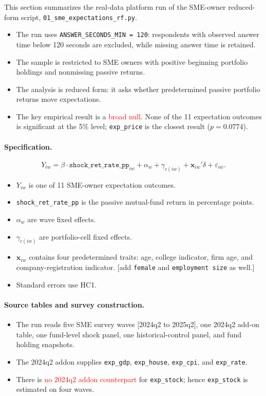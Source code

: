 \documentclass[11pt,letterpaper,english,final]{article}
\begin{document}
This section summarizes the real-data platform run of the SME-owner reduced-form script, \texttt{01\_sme\_expectations\_rf.py}.

\begin{itemize}
\item The run uses \texttt{ANSWER\_SECONDS\_MIN = 120}: respondents with observed answer time below 120 seconds are excluded, while missing answer time is retained.
\item The sample is restricted to SME owners with positive beginning portfolio holdings and nonmissing passive returns.
\item The analysis is reduced form: it asks whether predetermined passive portfolio returns move expectations.
\item The key empirical result is a \textcolor{red}{broad null}. None of the 11 expectation outcomes is significant at the 5\% level; \texttt{exp\_price} is the closest result ($p=0.0774$).
\end{itemize}

\paragraph{Specification.}
\[
Y_{iw}
= \beta \cdot \texttt{shock\_ret\_rate\_pp}_{iw}
+ \alpha_w
+ \gamma_{c(iw)}
+ \bm{x}_{iw}'\delta
+ \varepsilon_{iw}.
\]

\begin{itemize}
\item $Y_{iw}$ is one of 11 SME-owner expectation outcomes.
\item \texttt{shock\_ret\_rate\_pp} is the passive mutual-fund return in percentage points.
\item $\alpha_w$ are wave fixed effects.
\item $\gamma_{c(iw)}$ are portfolio-cell fixed effects.
\item $\bm{x}_{iw}$ contains four predetermined traits: age, college indicator, firm age, and company-registration indicator. {\color{cyan}[add \texttt{female} and \texttt{employment size} as well.]}
\item Standard errors use HC1.
\end{itemize}

\paragraph{Source tables and survey construction.}

\begin{itemize}
\item The run reads five SME survey waves {\color{cyan}[2024q2 to 2025q2]}, one 2024q2 add-on table, one fund-level shock panel, one historical-control panel, and fund holding snapshots.
\item The 2024q2 addon supplies \texttt{exp\_gdp}, \texttt{exp\_house}, \texttt{exp\_cpi}, and \texttt{exp\_rate}.
\item There is \textcolor{red}{no 2024q2 addon counterpart} for \texttt{exp\_stock}; hence \texttt{exp\_stock} is estimated on four waves.
\end{itemize}
\end{document}
